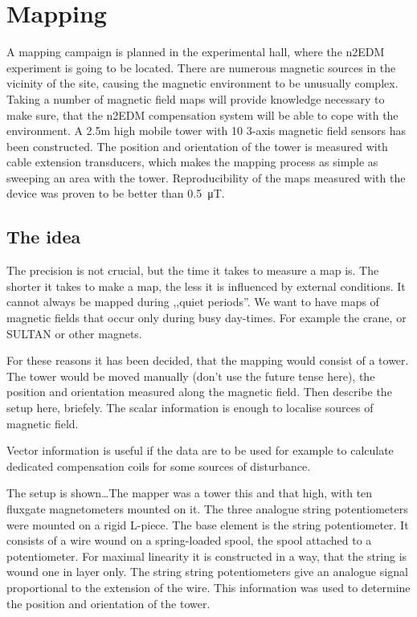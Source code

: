 \chapter{Mapping}
A mapping campaign is planned in the experimental hall, where the n2EDM experiment is going to be located. There are numerous magnetic sources in the vicinity of the site, causing the magnetic environment to be unusually complex. Taking a number of magnetic field maps will provide knowledge necessary to make sure, that the n2EDM compensation system will be able to cope with the environment. A 2.5m high mobile tower with 10 3-axis magnetic field sensors has been constructed. The position and orientation of the tower is measured with cable extension transducers, which makes the mapping process as simple as sweeping an area with the tower. Reproducibility of the maps measured with the device was proven to be better than \SI{0.5}{\micro\tesla}.



\section{The idea}
The precision is not crucial, but the time it takes to measure a map is. The shorter it takes to make a map, the less it is influenced by external conditions. It cannot always be mapped during ,,quiet periods''. We want to have maps of magnetic fields that occur only during busy day-times. For example the crane, or SULTAN or other magnets.

For these reasons it has been decided, that the mapping would consist of a tower. The tower would be moved manually (don't use the future tense here), the position and orientation measured along the magnetic field. Then describe the setup here, briefely. The scalar information is enough to localise sources of magnetic field.

Vector information is useful if the data are to be used for example to calculate dedicated compensation coils for some sources of disturbance.

The setup is shown\ldots The mapper was a tower this and that high, with ten fluxgate magnetometers mounted on it.
The three analogue string potentiometers were mounted on a rigid L-piece. The base element is the string potentiometer. It consists of a wire wound on a spring-loaded spool, the spool attached to a potentiometer. For maximal linearity it is constructed in a way, that the string is wound one in layer only. The string string potentiometers give an analogue signal proportional to the extension of the wire. This information was used to determine the position and orientation of the tower.


